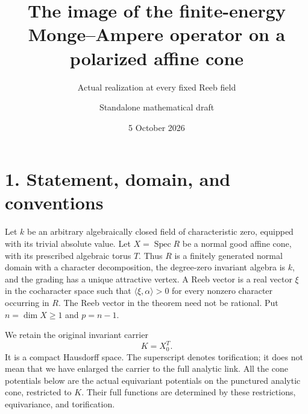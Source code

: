 \documentclass[
  10pt,
]{article}
\title{The image of the finite-energy Monge--Ampere operator on a
polarized affine cone}
\subtitle{Actual realization at every fixed Reeb field}
\author{Standalone mathematical draft}
\date{5 October 2026}
\begin{document}
\maketitle

\section{1. Statement, domain, and
conventions}\label{statement-domain-and-conventions}

Let \(k\) be an arbitrary algebraically closed field of characteristic
zero, equipped with its trivial absolute value. Let
\(X=\operatorname{Spec}R\) be a normal good affine cone, with its
prescribed algebraic torus \(T\). Thus \(R\) is a finitely generated
normal domain with a character decomposition, the degree-zero invariant
algebra is \(k\), and the grading has a unique attractive vertex. A Reeb
vector is a real vector \(\xi\) in the cocharacter space such that
\(\langle\xi,\alpha\rangle>0\) for every nonzero character occurring in
\(R\). The Reeb vector in the theorem need not be rational. Put
\(n=\dim X\geq1\) and \(p=n-1\).

We retain the original invariant carrier \[
                         K=X_0^T.
\] It is a compact Hausdorff space. The superscript denotes
torification; it does not mean that we have enlarged the carrier to the
full analytic link. All the cone potentials below are the actual
equivariant potentials on the punctured analytic cone, restricted to
\(K\). Their full functions are determined by these restrictions,
equivariance, and torification.
\end{document}
